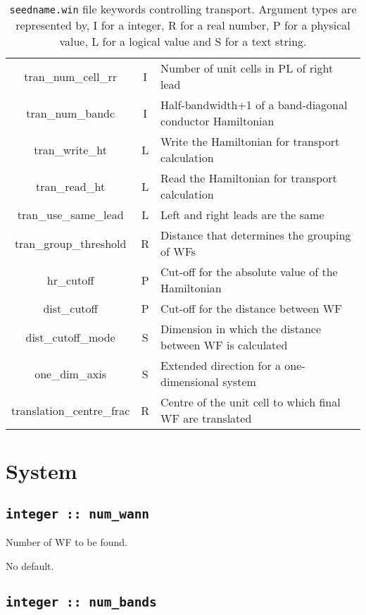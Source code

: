 \begin{table}
\begin{center}
\begin{tabular}{|c|c|p{6cm}|}
{\sc tran\_num\_cell\_rr } & I & Number of unit cells in PL of right lead \\
{\sc tran\_num\_bandc } & I & Half-bandwidth+1 of a band-diagonal conductor Hamiltonian \\ 
{\sc tran\_write\_ht } & L & Write the Hamiltonian for transport calculation \\ 
{\sc tran\_read\_ht } & L & Read the Hamiltonian for transport calculation \\
{\sc tran\_use\_same\_lead } & L & Left and right leads are the same \\
{\sc tran\_group\_threshold } & R & Distance that determines the grouping of WFs \\
{\sc hr\_cutoff} & P &  Cut-off for the absolute value of the Hamiltonian \\
{\sc dist\_cutoff} & P & Cut-off for the distance between WF \\
{\sc dist\_cutoff\_mode} & S & Dimension in which the distance between WF
is calculated \\
{\sc one\_dim\_axis} & S &  Extended direction for a one-dimensional system \\
{\sc translation\_centre\_frac } & R & Centre of the unit cell to which
final WF are translated \\ 
\hline
\end{tabular}
\caption[Parameter file keywords controlling transport.]
{{\tt seedname.win} file keywords controlling transport. Argument types
are represented by, I for a integer, R for a real number, P for a
physical value, L for a logical value and S for a text string.}
\label{parameter_keywords7}
\end{center}
\end{table}

\clearpage


\section{System}

\subsection[num\_wann]{\tt integer :: num\_wann}
Number of WF to be found.

No default.

\subsection[num\_bands]{\tt integer :: num\_bands} 

